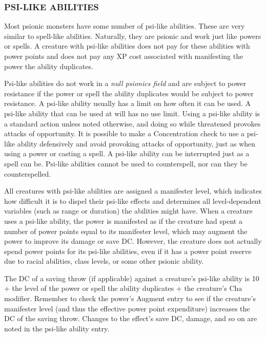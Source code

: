 \documentclass{article}
\begin{document}
\vspace{12pt}
\subsubsection*{PSI-LIKE ABILITIES}

Most psionic monsters have some number of psi-like abilities. These are very similar 
to spell-like abilities. Naturally, they are psionic and work just like powers 
or spells. A creature with psi-like abilities does not pay for these abilities 
with power points and does not pay any XP cost associated with manifesting the 
power the ability duplicates.

Psi-like abilities do not work in a \textit{null psionics field }and are subject 
to power resistance if the power or spell the ability duplicates would be subject 
to power resistance. A psi-like ability usually has a limit on how often it can 
be used. A psi-like ability that can be used at will has no use limit. Using a 
psi-like ability is a standard action unless noted otherwise, and doing so while 
threatened provokes attacks of opportunity. It is possible to make a Concentration 
check to use a psi-like ability defensively and avoid provoking attacks of opportunity, 
just as when using a power or casting a spell. A psi-like ability can be interrupted 
just as a spell can be. Psi-like abilities cannot be used to counterspell, nor 
can they be counterspelled.

All creatures with psi-like abilities are assigned a manifester level, which indicates 
how difficult it is to dispel their psi-like effects and determines all level-dependent 
variables (such as range or duration) the abilities might have. When a creature 
uses a psi-like ability, the power is manifested as if the creature had spent a 
number of power points equal to its manifester level, which may augment the power 
to improve its damage or save DC. However, the creature does not actually spend 
power points for its psi-like abilities, even if it has a power point reserve due 
to racial abilities, class levels, or some other psionic ability.

The DC of a saving throw (if applicable) against a creature's psi-like ability 
is 10 + the level of the power or spell the ability duplicates + the creature's 
Cha modifier. Remember to check the power's Augment entry to see if the creature's 
manifester level (and thus the effective power point expenditure) increases the 
DC of the saving throw. Changes to the effect's save DC, damage, and so on are 
noted in the psi-like ability entry.
\end{document}
